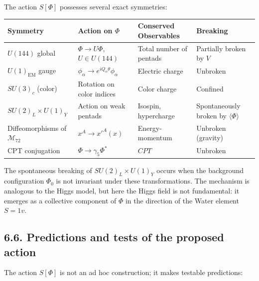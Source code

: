 \documentclass[11pt]{article}
\let\oldmathcal\mathcal
\renewcommand{\mathcal}[1]{\oldmathcal{#1}}
\begin{document}
The action \(S[\Phi]\) possesses several exact symmetries:

\begin{table}[H]
\centering
\begin{tabular}{@{}llll@{}}
\toprule
Symmetry & Action on $\Phi$ & Conserved Observables & Breaking \\ \midrule
$U(144)$ global & $\Phi \to U\Phi$, $U \in U(144)$ & Total number of pentads & Partially broken by $V$ \\
$U(1)_{\text{EM}}$ gauge & $\phi_\alpha \to e^{iQ_\alpha \theta} \phi_\alpha$ & Electric charge & Unbroken \\
$SU(3)_c$ (color) & Rotation on color indices & Color charge & Confined \\
$SU(2)_L \times U(1)_Y$ & Action on weak pentads & Isospin, hypercharge & Spontaneously broken by $\langle \Phi \rangle$ \\
Diffeomorphisms of $\mathcal{M}_{72}$ & $x^A \to x'^A(x)$ & Energy-momentum & Unbroken (gravity) \\
CPT conjugation & $\Phi \to \gamma_5 \Phi^*$ & $CPT$ & Unbroken \\ \bottomrule
\end{tabular}
\end{table}

The spontaneous breaking of \(SU(2)_L \times U(1)_Y\) occurs when the
background configuration \(\Phi_0\) is not invariant under these
transformations. The mechanism is analogous to the Higgs model, but here
the Higgs field is not fundamental: it emerges as a collective component
of \(\Phi\) in the direction of the Water element \(S=1v\).

\hypertarget{predictions-and-tests-of-the-proposed-action}{%
\subsection{6.6. Predictions and tests of the proposed
action}\label{predictions-and-tests-of-the-proposed-action}}

The action \(S[\Phi]\) is not an ad hoc construction; it makes testable
predictions:
\end{document}
